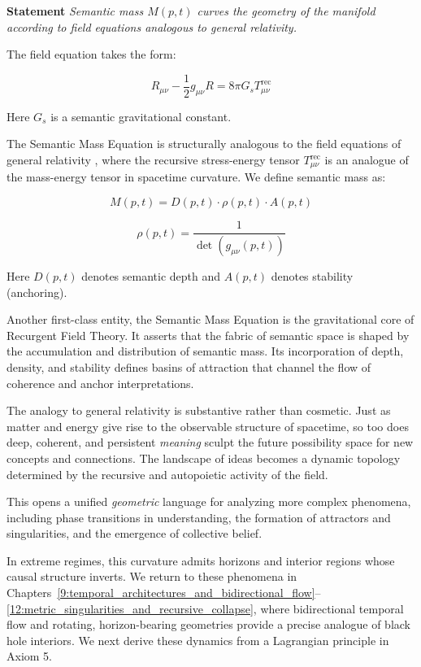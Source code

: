 \textbf{Statement} \textit{Semantic mass \(M(p,t)\) curves the geometry of the manifold according to field equations analogous to general relativity.}

The field equation takes the form:

\begin{equation}
R_{\mu\nu} - \frac{1}{2}g_{\mu\nu}R = 8\pi G_s T^{\text{rec}}_{\mu\nu}
\end{equation}

Here \(G_s\) is a semantic gravitational constant.

The Semantic Mass Equation is structurally analogous to the field equations of general relativity \autocite{Einstein1915, MisnerThorneWheeler1973, Wald1984}, where the recursive stress-energy tensor \(T^{\text{rec}}_{\mu\nu}\) is an analogue of the mass-energy tensor in spacetime curvature. We define semantic mass as:

\begin{equation}
M(p,t) = D(p,t) \cdot \rho(p,t) \cdot A(p,t)
\end{equation}

\begin{equation}
\rho(p,t) = \frac{1}{\det(g_{\mu\nu}(p,t))}
\end{equation}

Here \(D(p,t)\) denotes semantic depth and \(A(p,t)\) denotes stability (anchoring).

Another first-class entity, the Semantic Mass Equation is the gravitational core of Recurgent Field Theory. It asserts that the fabric of semantic space is shaped by the accumulation and distribution of semantic mass. Its incorporation of depth, density, and stability defines basins of attraction that channel the flow of coherence and anchor interpretations.

The analogy to general relativity is substantive rather than cosmetic. Just as matter and energy give rise to the observable structure of spacetime, so too does deep, coherent, and persistent \textit{meaning} sculpt the future possibility space for new concepts and connections. The landscape of ideas becomes a dynamic topology determined by the recursive and autopoietic activity of the field.

This opens a unified \textit{geometric} language for analyzing more complex phenomena, including phase transitions in understanding, the formation of attractors and singularities, and the emergence of collective belief.

In extreme regimes, this curvature admits horizons and interior regions whose causal structure inverts. We return to these phenomena in Chapters~\ref{9:temporal_architectures_and_bidirectional_flow}--\ref{12:metric_singularities_and_recursive_collapse}, where bidirectional temporal flow and rotating, horizon-bearing geometries provide a precise analogue of black hole interiors. We next derive these dynamics from a Lagrangian principle in Axiom 5.

